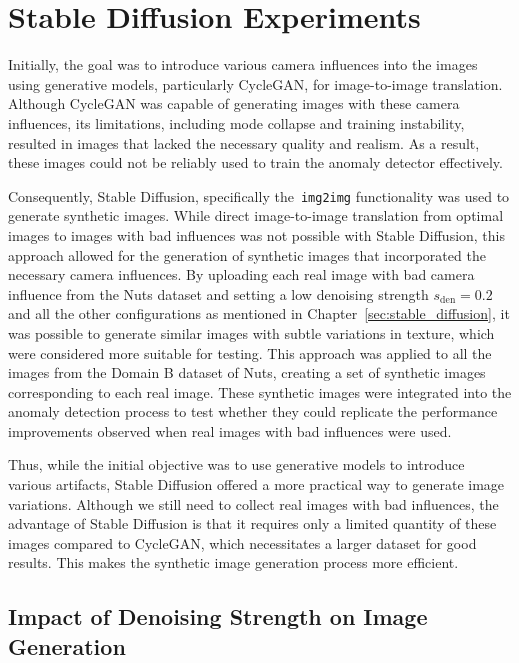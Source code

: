 \documentclass[12pt,DIV14,BCOR12mm,a4paper,footinclude=false,headinclude,parskip=half-,twoside,openright,cleardoublepage=empty,toc=index,bibliography=totoc,listof=totoc]{scrreprt}
\numberwithin{equation}{chapter}
\begin{document}
\section{Stable Diffusion Experiments}

Initially, the goal was to introduce various camera influences into the images using generative models, particularly CycleGAN, for image-to-image translation. Although CycleGAN was capable of generating images with these camera influences, its limitations, including mode collapse and training instability, resulted in images that lacked the necessary quality and realism. As a result, these images could not be reliably used to train the anomaly detector effectively.

Consequently, Stable Diffusion, specifically the~\texttt{img2img} functionality was used to generate synthetic images. While direct image-to-image translation from optimal images to images with bad influences was not possible with Stable Diffusion, this approach allowed for the generation of synthetic images that incorporated the necessary camera influences. By uploading each real image with bad camera influence from the Nuts dataset and setting a low denoising strength $s_{\text{den}} = 0.2$ and all the other configurations as mentioned in Chapter~\ref{sec:stable_diffusion}, it was possible to generate similar images with subtle variations in texture, which were considered more suitable for testing. This approach was applied to all the images from the Domain B dataset of Nuts, creating a set of synthetic images corresponding to each real image. These synthetic images were integrated into the anomaly detection process to test whether they could replicate the performance improvements observed when real images with bad influences were used.

Thus, while the initial objective was to use generative models to introduce various artifacts, Stable Diffusion offered a more practical way to generate image variations. Although we still need to collect real images with bad influences, the advantage of Stable Diffusion is that it requires only a limited quantity of these images compared to CycleGAN, which necessitates a larger dataset for good results. This makes the synthetic image generation process more efficient.

\subsection{Impact of Denoising Strength on Image Generation}
\end{document}
